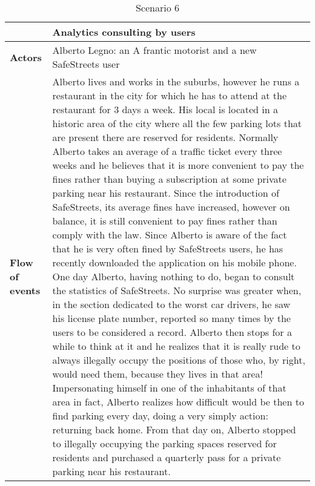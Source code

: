 \begin{table}[!htbp]
	\centering
\begin{tabular}{lp{9.8cm}}
\hline
\bf\large  &\bf\large Analytics consulting by users\\
\hline
\hline

\bf Actors&Alberto Legno: an A frantic motorist and a new SafeStreets user\\
\hline
\bf Flow of events&
Alberto lives and works in the suburbs, however he runs a restaurant in the city for which he has to attend at the restaurant for 3 days a week.
His local is located in a historic area of ​​the city where all the few parking lots that are present there are reserved for residents. 
Normally Alberto takes an average of a traffic ticket every three weeks and he believes that it is more convenient to pay the fines rather than buying a subscription at some private parking near his restaurant.
Since the introduction of SafeStreets, its average fines have increased, however on balance, it is still convenient to pay fines rather than comply with the law.
Since Alberto is aware of the fact that he is very often fined by SafeStreets users, he has recently downloaded the application on his mobile phone. One day Alberto, having nothing to do, began to consult the statistics of SafeStreets. No surprise was greater when, in the section dedicated to the worst car drivers, he saw his license plate number, reported so many times by the users to be considered a record.
Alberto then stops for a while to think at it and he realizes that it is really rude to always illegally occupy the positions of those who, by right, would need them, because they lives in that area! Impersonating himself in one of the inhabitants of that area in fact, Alberto realizes how difficult would be then to find parking every day, doing a very simply action: returning back home.
From that day on, Alberto stopped to illegally occupying the parking spaces reserved for residents and purchased a quarterly pass for a private parking near his restaurant.
\end{tabular}
\caption{Scenario 6} 
\label{tab:scenariosix}
\end{table}